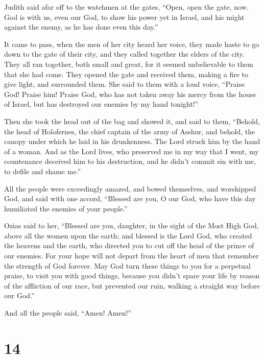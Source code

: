  Judith said afar off to the watchmen at the gates, ``Open,
open the gate, now. God is with us, even our God, to show his power yet
in Israel, and his might against the enemy, as he has done even this
day.''

 It came to pass, when the men of her city heard her voice,
they made haste to go down to the gate of their city, and they called
together the elders of the city.  They all ran together,
both small and great, for it seemed unbelievable to them that she had
come. They opened the gate and received them, making a fire to give
light, and surrounded them.  She said to them with a loud
voice, ``Praise God! Praise him! Praise God, who has not taken away his
mercy from the house of Israel, but has destroyed our enemies by my hand
tonight!''

 Then she took the head out of the bag and showed it, and
said to them, ``Behold, the head of Holofernes, the chief captain of the
army of Asshur, and behold, the canopy under which he laid in his
drunkenness. The Lord struck him by the hand of a woman. 
And as the Lord lives, who preserved me in my way that I went, my
countenance deceived him to his destruction, and he didn't commit sin
with me, to defile and shame me.''

 All the people were exceedingly amazed, and bowed
themselves, and worshipped God, and said with one accord, ``Blessed are
you, O our God, who have this day humiliated the enemies of your
people.''

 Ozias said to her, ``Blessed are you, daughter, in the
sight of the Most High God, above all the women upon the earth; and
blessed is the Lord God, who created the heavens and the earth, who
directed you to cut off the head of the prince of our enemies.
 For your hope will not depart from the heart of men that
remember the strength of God forever.  May God turn these
things to you for a perpetual praise, to visit you with good things,
because you didn't spare your life by reason of the affliction of our
race, but prevented our ruin, walking a straight way before our God.''

And all the people said, ``Amen! Amen!''

\hypertarget{section-13}{%
\section{14}\label{section-13}}

